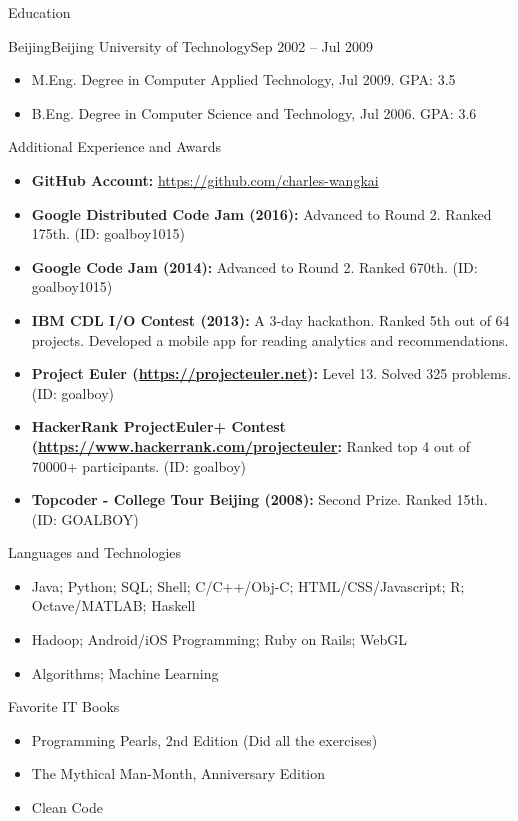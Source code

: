 \documentclass[]{mcdowellcv}
\begin{document}
	\begin{cvsection}{Education}
		\begin{cvsubsection}{Beijing}{Beijing University of Technology}{Sep 2002 – Jul 2009}
			\begin{itemize}
				\item M.Eng. Degree in Computer Applied Technology, Jul 2009. GPA: 3.5
				\item B.Eng. Degree in Computer Science and Technology, Jul 2006. GPA: 3.6
			\end{itemize}
		\end{cvsubsection}
	\end{cvsection}
	
	\begin{cvsection}{Additional Experience and Awards}
		\begin{cvsubsection}{}{}{}
			\begin{itemize}
				\item \textbf{GitHub Account:} \url{https://github.com/charles-wangkai}
				\item \textbf{Google Distributed Code Jam (2016):} Advanced to Round 2. Ranked 175th. (ID: goalboy1015)
				\item \textbf{Google Code Jam (2014):} Advanced to Round 2. Ranked 670th. (ID: goalboy1015)
				\item \textbf{IBM CDL I/O Contest (2013):} A 3-day hackathon. Ranked 5th out of 64 projects. Developed a mobile app for reading analytics and recommendations.
				\item \textbf{Project Euler (\url{https://projecteuler.net}):} Level 13. Solved 325 problems. (ID: goalboy)
				\item \textbf{HackerRank ProjectEuler+ Contest (\url{https://www.hackerrank.com/projecteuler}:} Ranked top 4 out of 70000+ participants. (ID: goalboy)
				\item \textbf{Topcoder - College Tour Beijing (2008):} Second Prize. Ranked 15th. (ID: GOALBOY)
			\end{itemize}
		\end{cvsubsection}
	\end{cvsection}
	
	\begin{cvsection}{Languages and Technologies}
		\begin{cvsubsection}{}{}{}
			\begin{itemize}
				\item Java; Python; SQL; Shell; C/C++/Obj-C; HTML/CSS/Javascript; R; Octave/MATLAB; Haskell
				\item Hadoop; Android/iOS Programming; Ruby on Rails; WebGL
				\item Algorithms; Machine Learning
			\end{itemize}
		\end{cvsubsection}
	\end{cvsection}
	
	\begin{cvsection}{Favorite IT Books}
		\begin{cvsubsection}{}{}{}
			\begin{itemize}
				\item Programming Pearls, 2nd Edition (Did all the exercises)
				\item The Mythical Man-Month, Anniversary Edition
				\item Clean Code
			\end{itemize}
		\end{cvsubsection}
	\end{cvsection}
	
\end{document}
